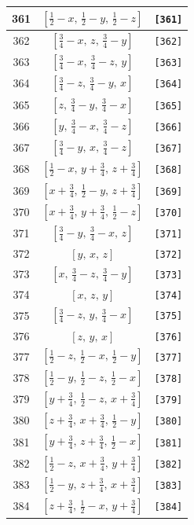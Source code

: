 \documentclass[fleqn,8pt]{jsarticle}
\begin{document}
\begin{longtable}{ccc}
361 & $\left[ \frac{1}{2} - x,\, \frac{1}{2} - y,\, \frac{1}{2} - z \right]$ & {\tt [361]} \\ \hline
362 & $\left[ \frac{3}{4} - x,\, z,\, \frac{3}{4} - y \right]$ & {\tt [362]} \\ \hline
363 & $\left[ \frac{3}{4} - x,\, \frac{3}{4} - z,\, y \right]$ & {\tt [363]} \\ \hline
364 & $\left[ \frac{3}{4} - z,\, \frac{3}{4} - y,\, x \right]$ & {\tt [364]} \\ \hline
365 & $\left[ z,\, \frac{3}{4} - y,\, \frac{3}{4} - x \right]$ & {\tt [365]} \\ \hline
366 & $\left[ y,\, \frac{3}{4} - x,\, \frac{3}{4} - z \right]$ & {\tt [366]} \\ \hline
367 & $\left[ \frac{3}{4} - y,\, x,\, \frac{3}{4} - z \right]$ & {\tt [367]} \\ \hline
368 & $\left[ \frac{1}{2} - x,\, y + \frac{3}{4},\, z + \frac{3}{4} \right]$ & {\tt [368]} \\ \hline
369 & $\left[ x + \frac{3}{4},\, \frac{1}{2} - y,\, z + \frac{3}{4} \right]$ & {\tt [369]} \\ \hline
370 & $\left[ x + \frac{3}{4},\, y + \frac{3}{4},\, \frac{1}{2} - z \right]$ & {\tt [370]} \\ \hline
371 & $\left[ \frac{3}{4} - y,\, \frac{3}{4} - x,\, z \right]$ & {\tt [371]} \\ \hline
372 & $\left[ y,\, x,\, z \right]$ & {\tt [372]} \\ \hline
373 & $\left[ x,\, \frac{3}{4} - z,\, \frac{3}{4} - y \right]$ & {\tt [373]} \\ \hline
374 & $\left[ x,\, z,\, y \right]$ & {\tt [374]} \\ \hline
375 & $\left[ \frac{3}{4} - z,\, y,\, \frac{3}{4} - x \right]$ & {\tt [375]} \\ \hline
376 & $\left[ z,\, y,\, x \right]$ & {\tt [376]} \\ \hline
377 & $\left[ \frac{1}{2} - z,\, \frac{1}{2} - x,\, \frac{1}{2} - y \right]$ & {\tt [377]} \\ \hline
378 & $\left[ \frac{1}{2} - y,\, \frac{1}{2} - z,\, \frac{1}{2} - x \right]$ & {\tt [378]} \\ \hline
379 & $\left[ y + \frac{3}{4},\, \frac{1}{2} - z,\, x + \frac{3}{4} \right]$ & {\tt [379]} \\ \hline
380 & $\left[ z + \frac{3}{4},\, x + \frac{3}{4},\, \frac{1}{2} - y \right]$ & {\tt [380]} \\ \hline
381 & $\left[ y + \frac{3}{4},\, z + \frac{3}{4},\, \frac{1}{2} - x \right]$ & {\tt [381]} \\ \hline
382 & $\left[ \frac{1}{2} - z,\, x + \frac{3}{4},\, y + \frac{3}{4} \right]$ & {\tt [382]} \\ \hline
383 & $\left[ \frac{1}{2} - y,\, z + \frac{3}{4},\, x + \frac{3}{4} \right]$ & {\tt [383]} \\ \hline
384 & $\left[ z + \frac{3}{4},\, \frac{1}{2} - x,\, y + \frac{3}{4} \right]$ & {\tt [384]} \\
\end{longtable}
\end{document}
